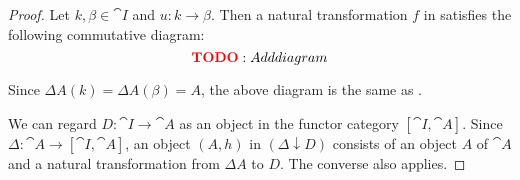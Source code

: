 \begin{proof}
   Let \( k, \beta \in \cat{I} \) and \( u: k \to \beta \). Then a natural transformation \( f \) in  satisfies the following commutative diagram:
  \begin{equation*}
    \todo{Add diagram}\iffalse\begin{mplibcode}
      beginfig(1);
      input metapost/graphs;

      v1 := thelabel("$\Delta A(k)$", (-1, 0) scaled u);
      v2 := thelabel("$\Delta A(\beta)$", (1, 0) scaled u);
      v3 := thelabel("$D(k)$", (-1, -1) scaled u);
      v4 := thelabel("$D(\beta)$", (1, -1) scaled u);

      a1 := straight_arc(v1, v2);
      a2 := straight_arc(v1, v3);
      a3 := straight_arc(v2, v4);
      a4 := straight_arc(v3, v4);

      draw_vertices(v);
      draw_arcs(a);

      label.top("$\Delta A(u)$", straight_arc_midpoint of a1);
      label.lft("$\pi_k$", straight_arc_midpoint of a2);
      label.rt("$\pi_\beta$", straight_arc_midpoint of a3);
      label.bot("$D(u)$", straight_arc_midpoint of a4);
      endfig;
    \end{mplibcode}\fi
  \end{equation*}

  Since \( \Delta A(k) = \Delta A(\beta) = A \), the above diagram is the same as .

   We can regard \( D: \cat{I} \to \cat{A} \) as an object in the functor category \( [\cat{I}, \cat{A}] \). Since \( \Delta: \cat{A} \to [\cat{I}, \cat{A}] \), an object \( (A, h) \) in \( (\Delta \downarrow D) \) consists of an object \( A \) of \( \cat{A} \) and a natural transformation from \( \Delta A \) to \( D \). The converse also applies.
\end{proof}

